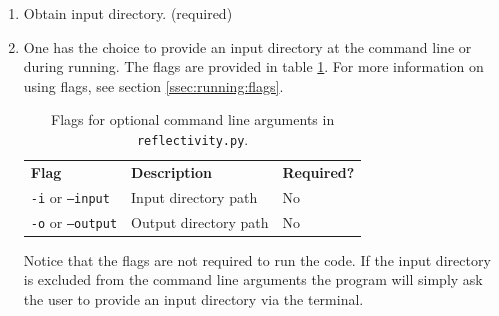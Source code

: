 \begin{enumerate}
	\item	Obtain input directory. (required)
	\item[]	%
		{One has the choice to provide an input directory at the command line or during running. The flags are provided in table \ref{tab:reflectivity:flags}. For more information on using flags, see section \ref{ssec:running:flags}.
		
		\begin{table}[H]
			\begin{center}
				\begin{tabular}{l l l}
					\hline
					\textbf{Flag}	&	\textbf{Description}	&	\textbf{Required?}\\
					\texttt{-i} or \texttt{--input}	& Input directory path	&	No	\\
					\texttt{-o} or \texttt{--output}	& Output directory path	&	No	\\
					\hline
				\end{tabular}
			\end{center}
			\caption[Reflectivity flags.]{\label{tab:reflectivity:flags}%
				Flags for optional command line arguments in \texttt{reflectivity.py}.%
			}
		\end{table}
		
		Notice that the flags are not required to run the code. If the input directory is excluded from the command line arguments the program will simply ask the user to provide an input directory via the terminal.
		
}
\end{enumerate}
